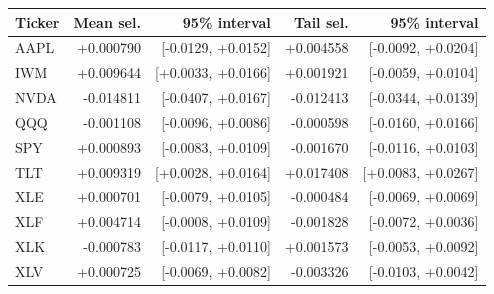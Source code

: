 \begin{tabular}{lrrrr}
\toprule
Ticker & Mean sel. & 95\% interval & Tail sel. & 95\% interval \\
\midrule
AAPL & +0.000790 & [-0.0129, +0.0152] & +0.004558 & [-0.0092, +0.0204] \\
IWM & +0.009644 & [+0.0033, +0.0166] & +0.001921 & [-0.0059, +0.0104] \\
NVDA & -0.014811 & [-0.0407, +0.0167] & -0.012413 & [-0.0344, +0.0139] \\
QQQ & -0.001108 & [-0.0096, +0.0086] & -0.000598 & [-0.0160, +0.0166] \\
SPY & +0.000893 & [-0.0083, +0.0109] & -0.001670 & [-0.0116, +0.0103] \\
TLT & +0.009319 & [+0.0028, +0.0164] & +0.017408 & [+0.0083, +0.0267] \\
XLE & +0.000701 & [-0.0079, +0.0105] & -0.000484 & [-0.0069, +0.0069] \\
XLF & +0.004714 & [-0.0008, +0.0109] & -0.001828 & [-0.0072, +0.0036] \\
XLK & -0.000783 & [-0.0117, +0.0110] & +0.001573 & [-0.0053, +0.0092] \\
XLV & +0.000725 & [-0.0069, +0.0082] & -0.003326 & [-0.0103, +0.0042] \\
\bottomrule
\end{tabular}
